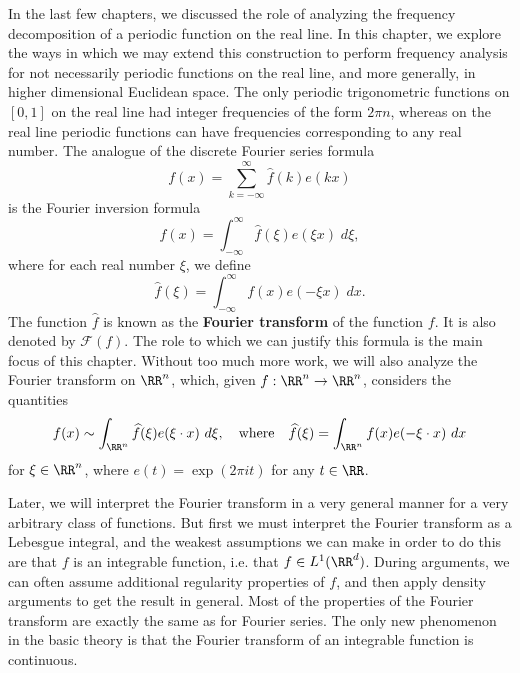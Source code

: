 In the last few chapters, we discussed the role of analyzing the frequency decomposition of a periodic function on the real line. In this chapter, we explore the ways in which we may extend this construction to perform frequency analysis for not necessarily periodic functions on the real line, and more generally, in higher dimensional Euclidean space. The only periodic trigonometric functions on $[0,1]$ on the real line had integer frequencies of the form $2\pi n$, whereas on the real line periodic functions can have frequencies corresponding to any real number. The analogue of the discrete Fourier series formula
%
\[ f(x) = \sum_{k = -\infty}^\infty \widehat{f}(k) e(kx) \]
%
is the Fourier inversion formula
%
\[ f(x) = \int_{-\infty}^\infty \widehat{f}(\xi) e(\xi x)\; d\xi, \]
%
where for each real number $\xi$, we define
%
\[ \widehat{f}(\xi) = \int_{-\infty}^\infty f(x) e(- \xi x)\; dx. \]
%
The function $\widehat{f}$ is known as the {\bf Fourier transform} of the function $f$. It is also denoted by $\mathcal{F}(f)$. The role to which we can justify this formula is the main focus of this chapter. Without too much more work, we will also analyze the Fourier transform on $\RR^n$, which, given $f: \RR^n \to \RR^n$, considers the quantities
%
\[ f(x) \sim \int_{\RR^n} \widehat{f}(\xi) e(\xi \cdot x)\ d\xi,\quad\text{where}\quad \widehat{f}(\xi) = \int_{\RR^n} f(x) e(- \xi \cdot x)\ dx \]
%
for $\xi \in \RR^n$, where $e(t) = \exp(2 \pi i t)$ for any $t \in \RR$.

Later, we will interpret the Fourier transform in a very general manner for a very arbitrary class of functions. But first we must interpret the Fourier transform as a Lebesgue integral, and the weakest assumptions we can make in order to do this are that $f$ is an integrable function, i.e. that $f \in L^1(\RR^d)$. During arguments, we can often assume additional regularity properties of $f$, and then apply density arguments to get the result in general. Most of the properties of the Fourier transform are exactly the same as for Fourier series. The only new phenomenon in the basic theory is that the Fourier transform of an integrable function is continuous.

